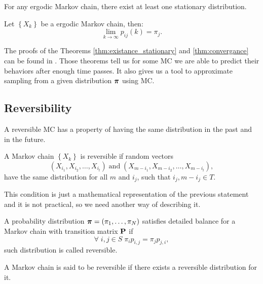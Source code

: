 	\begin{theorem} \label{thm:existance_stationary}
		For any ergodic Markov chain, there exist at least one stationary distribution.
	\end{theorem}
	
	
	\begin{theorem} \label{thm:convergance}
		Let $\left\{X_k\right\}$ be a ergodic Markov chain, then:
		\begin{equation*}
			\lim_{k \rightarrow \infty} p_{ij}(k) = \pi_j.
		\end{equation*}
	\end{theorem}
	The proofs of the Theorems \ref{thm:existance_stationary} and \ref{thm:convergance} can be found in \cite{haggstrom2002finite}. Those theorems tell us for some MC we are able to predict their behaviors after enough time passes. It also gives us a tool to approximate sampling from a given distribution $\boldsymbol{\pi}$ using MC.
	
\subsection{Reversibility}
	A reversible MC has a property of having the same distribution in the past and in the future.
	\begin{definition}[Reversibility]
		A Markov chain $\left\{X_k\right\}$ is reversible if random vectors
		\begin{equation*}
			(X_{i_1}, X_{i_2}, \ldots, X_{i_l}) \; \mathrm{and} \; (X_{m-i_1}, X_{m-i_2}, \ldots, X_{m-i_l}),
		\end{equation*}
		have the same distribution for all $m$ and $i_j$, such that $i_j, m-i_j \in T$.
	\end{definition}
	
	This condition is just a mathematical representation of the previous statement and it is not practical, so we need another way of describing it.
	\begin{definition}
		A probability distribution $\boldsymbol{\pi} = (\pi_1, \ldots, \pi_N)$ satisfies detailed balance for a Markov chain with transition matrix $\mathbf{P}$ if
		\begin{equation*}
			\forall \; i,j \in S \; \pi_i p_{i,j} = \pi_j p_{j,i},
		\end{equation*}
		such distribution is called reversible.
	\end{definition}
	
	\begin{definition}
		A Markov chain is said to be reversible if there exists a reversible distribution for it.
	\end{definition}

